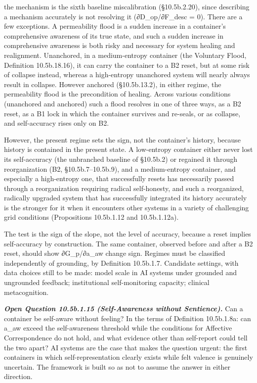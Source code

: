 \documentclass[
]{article}
\begin{document}
the mechanism is the sixth baseline miscalibration (§10.5b.2.20), since
describing a mechanism accurately is not resolving it (∂D\_op/∂F\_desc =
0). There are a few exceptions. A permeability flood is a sudden
increase in a container's comprehensive awareness of its true state, and
such a sudden increase in comprehensive awareness is both risky and
necessary for system healing and realignment. Unanchored, in a
medium-entropy container (the Voluntary Flood, Definition 10.5b.18.16),
it can carry the container to a B2 reset, but at some risk of collapse
instead, whereas a high-entropy unanchored system will nearly always
result in collapse. However anchored (§10.5b.13.2), in either regime,
the permeability flood is the precondition of healing. Across various
conditions (unanchored and anchored) such a flood resolves in one of
three ways, as a B2 reset, as a B1 lock in which the container survives
and re-seals, or as collapse, and self-accuracy rises only on B2.

However, the present regime sets the sign, not the container's history,
because history is contained in the present state. A low-entropy
container either never lost its self-accuracy (the unbranched baseline
of §10.5b.2) or regained it through reorganization (B2,
§10.5b.7--10.5b.9), and a medium-entropy container, and especially a
high-entropy one, that successfully resets has necessarily passed
through a reorganization requiring radical self-honesty, and such a
reorganized, radically upgraded system that has successfully integrated
its history accurately is the stronger for it when it encounters other
systems in a variety of challenging grid conditions (Propositions
10.5b.1.12 and 10.5b.1.12a).

The test is the sign of the slope, not the level of accuracy, because a
reset implies self-accuracy by construction. The same container,
observed before and after a B2 reset, should show ∂G\_p/∂a\_aw change
sign. Regimes must be classified independently of grounding, by
Definition 10.5b.1.7. Candidate settings, with data choices still to be
made: model scale in AI systems under grounded and ungrounded feedback;
institutional self-monitoring capacity; clinical metacognition.

\emph{\textbf{Open Question 10.5b.1.15 (Self-Awareness without
Sentience).}} Can a container be self-aware without feeling? In the
terms of Definition 10.5b.1.8a: can a\_aw exceed the self-awareness
threshold while the conditions for Affective Correspondence do not hold,
and what evidence other than self-report could tell the two apart? AI
systems are the case that makes the question urgent: the first
containers in which self-representation clearly exists while felt
valence is genuinely uncertain. The framework is built so as not to
assume the answer in either direction.
\end{document}
